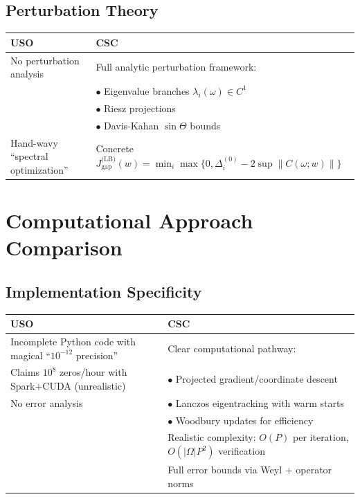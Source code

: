 \documentclass[10pt]{article}
\begin{document}
\subsection*{Perturbation Theory}

\begin{table}[h!]
\centering
\begin{tabular}{L{6cm}L{6cm}}
\toprule
\textcolor{usored}{\textbf{USO}} & \textcolor{cscgreen}{\textbf{CSC}} \\
\midrule
No perturbation analysis & Full analytic perturbation framework: \\
& \quad $\bullet$ Eigenvalue branches $\lambda_i(\omega) \in C^1$ \\
& \quad $\bullet$ Riesz projections \\
& \quad $\bullet$ Davis-Kahan $\sin\Theta$ bounds \\
Hand-wavy ``spectral optimization'' & Concrete $J_{\text{gap}}^{\text{(LB)}}(w) = \min_i \max\{0, \Delta_i^{(0)} - 2\sup\|C(\omega; w)\|\}$ \\
\bottomrule
\end{tabular}
\end{table}

\section*{Computational Approach Comparison}

\subsection*{Implementation Specificity}

\begin{table}[h!]
\centering
\begin{tabular}{L{6cm}L{6cm}}
\toprule
\textcolor{usored}{\textbf{USO}} & \textcolor{cscgreen}{\textbf{CSC}} \\
\midrule
Incomplete Python code with magical ``$10^{-12}$ precision'' & Clear computational pathway: \\
Claims $10^8$ zeros/hour with Spark+CUDA (unrealistic) & \quad $\bullet$ Projected gradient/coordinate descent \\
No error analysis & \quad $\bullet$ Lanczos eigentracking with warm starts \\
& \quad $\bullet$ Woodbury updates for efficiency \\
& Realistic complexity: $O(P)$ per iteration, $O(|\Omega|P^2)$ verification \\
& Full error bounds via Weyl + operator norms \\
\bottomrule
\end{tabular}
\end{table}
\end{document}
